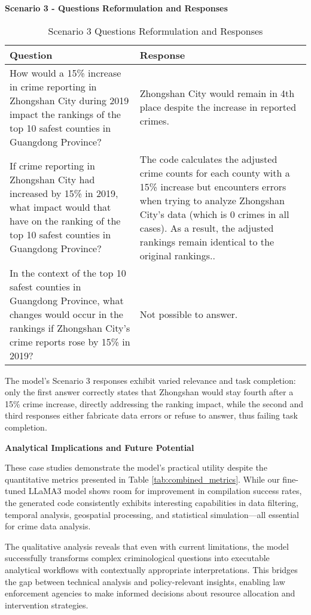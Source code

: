 \noindent \textbf{Scenario 3 - Questions Reformulation and Responses}

\begin{table}[H]
\centering
\caption{Scenario 3 Questions Reformulation and Responses}
\label{tab:questions_responses_3}
\begin{tabular}{|p{}|p{}|}
\hline
\textbf{Question} & \textbf{Response} \\
\hline
How would a 15\% increase in crime reporting in Zhongshan City during 2019 impact the rankings of the top 10 safest counties in Guangdong Province? & Zhongshan City would remain in 4th place despite the increase in reported crimes. \\
\hline
If crime reporting in Zhongshan City had increased by 15\% in 2019, what impact would that have on the ranking of the top 10 safest counties in Guangdong Province? &The code calculates the adjusted crime counts for each county with a 15\% increase but encounters errors when trying to analyze Zhongshan City's data (which is 0 crimes in all cases). As a result, the adjusted rankings remain identical to the original rankings.. \\
\hline
In the context of the top 10 safest counties in Guangdong Province, what changes would occur in the rankings if Zhongshan City's crime reports rose by 15\% in 2019? & Not possible to answer. \\
\hline
\end{tabular}
\end{table}
The model's Scenario 3 responses exhibit varied relevance and task completion: only the first answer correctly states that Zhongshan would stay fourth after a 15\% crime increase, directly addressing the ranking impact, while the second and third responses either fabricate data errors or refuse to answer, thus failing task completion.


\noindent \textbf{Analytical Implications and Future Potential}

These case studies demonstrate the model's practical utility despite the quantitative metrics presented in Table \ref{tab:combined_metrics}. While our fine-tuned LLaMA3 model shows room for improvement in compilation success rates, the generated code consistently exhibits interesting capabilities in data filtering, temporal analysis, geospatial processing, and statistical simulation—all essential for crime data analysis.

The qualitative analysis reveals that even with current limitations, the model successfully transforms complex criminological questions into executable analytical workflows with contextually appropriate interpretations. This bridges the gap between technical analysis and policy-relevant insights, enabling law enforcement agencies to make informed decisions about resource allocation and intervention strategies.

